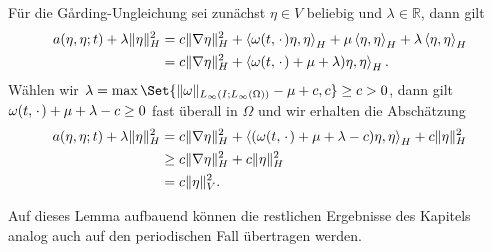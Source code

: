 \documentclass[../main.tex]{subfiles}
\begin{document}
\begin{Lemma}
\begin{Beweis}
        Für die G\aa{}rding-Ungleichung sei zunächst $\eta \in V$ beliebig und $\lambda \in \mathbb{R}$, dann gilt
        \begin{align}
            a(\eta, \eta; t) + \lambda \lVert\eta\rVert^{2}_{H}
            &= c \lVert\nabla \eta\rVert^{2}_{H} + \left\langle\omega(t, {\mkern2mu\cdot\mkern2mu}) \eta,\eta\right\rangle_{H} + \mu \left\langle\eta,\eta\right\rangle_{H} + \lambda \left\langle\eta,\eta\right\rangle_{H}
            \\&= c \lVert\nabla \eta\rVert^{2}_{H} + \left\langle\omega(t, {\mkern2mu\cdot\mkern2mu}) + \mu + \lambda) \eta,\eta\right\rangle_{H}.
        \end{align}
        Wählen wir $\lambda = \max\Set{\norm{\omega}_{L_{\infty}(I; L_{\infty}(\Omega))} - \mu + c, c} \geq c > 0$, dann gilt $\omega(t, {\mkern2mu\cdot\mkern2mu}) + \mu + \lambda - c \geq 0$ fast überall in $\Omega$ und wir erhalten die Abschätzung
        \begin{align}
            a(\eta, \eta; t) + \lambda \lVert\eta\rVert^{2}_{H}
            &= c \lVert\nabla \eta\rVert^{2}_{H} + \left\langle(\omega(t, {\mkern2mu\cdot\mkern2mu}) + \mu + \lambda - c) \eta,\eta\right\rangle_{H} + c \lVert\eta\rVert^{2}_{H} \\
            &\geq c \lVert\nabla \eta\rVert^{2}_{H} + c \lVert\eta\rVert^{2}_{H}
            \\&= c \lVert\eta\rVert^{2}_{V}.
        \end{align}
    \end{Beweis}
\end{Lemma}

Auf dieses Lemma aufbauend können die restlichen Ergebnisse des Kapitels analog auch auf den periodischen Fall übertragen werden.
\end{document}
